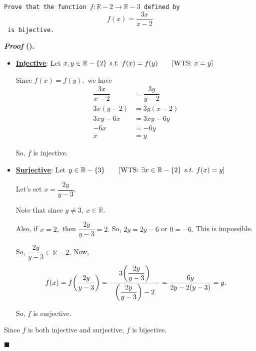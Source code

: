 \documentclass[12pt,a4paper]{article}
\newcounter{nprf}[subsection]
\newenvironment*{prf}{\par\indent\textbf{\textit{Proof} (\stepcounter{nprf}\thenprf). }\par }{\par\hfill $\blacksquare$\par}
\def\R{{\mathbb{R}}}
\def\st{\emph{ s.t. }}
\begin{document}
\begin{framed}
\noindent\texttt{Prove that the function $f:\R-\qty{2}\to\R-\qty{3}$ defined by \[f(x)=\dfrac{3x}{x-2}\] is bijective.}
\begin{prf}
	\begin{itemize}
		\item \textbf{\underline{Injective}}: Let $x,y\in\R-\qty{2}\st f(x)=f(y)\qquad[\text{WTS: }x=y]$\par Since $f(x)=f(y),$ we have \[\begin{aligned}\dfrac{3x}{x-2}&=\dfrac{3y}{y-2}\\3x(y-2)&=3y(x-2)\\3xy-6x&=3xy-6y\\-6x&=-6y\\x&=y\end{aligned}\]\par So, $f$ is injective. 
		\item \textbf{\underline{Surjective}}: Let $y\in\R-\qty{3}\qquad[\text{WTS: }\exists x\in\R-\qty{2}\st f(x)=y]$\par Let's set $x=\dfrac{2y}{y-3}.$\par  Note that since $y\neq3,\ x\in\R.$\par Also, if $x=2,$ then $\dfrac{2y}{y-3}=2.$ So, $2y=2y-6$ or $0=-6.$ This is impossible. \par So, $\dfrac{2y}{y-3}\in\R-\qty{2}.$ Now, \[f(x)=f\qty(\dfrac{2y}{y-3})=\dfrac{\ \ 3\qty(\dfrac{2y}{y-3})\ \ }{\ \ \qty(\dfrac{2y}{y-3})-2\ \ }=\dfrac{6y}{2y-2(y-3)}=y.\]\par So, $f$ is surjective. 
	\end{itemize}\par 
	Since $f$ is both injective and surjective, $f$ is bijective. 
\end{prf}	
\end{framed}
\end{document}
